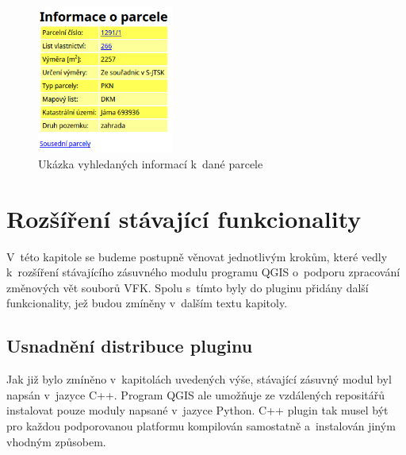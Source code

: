 \documentclass[a4paper,12pt,oneside]{book}
\begin{document}
\begin{figure}[htb]
\centering
\includegraphics[width=0.4\textwidth]{images/vfkPlugin-informace_o_parcele.png}
\caption[Ukázka vyhledaných informací k~dané parcele]{Ukázka vyhledaných informací k~dané parcele}
\label{l_informace_o_parcele}
\end{figure}



\clearpage
\chapter{Rozšíření stávající funkcionality}
\label{l_rozsireni_funkcionality}

V~této kapitole se budeme postupně věnovat jednotlivým krokům,
které vedly k~rozšíření stávajícího zásuvného modulu programu QGIS
o~podporu zpracování změnových vět souborů VFK. Spolu s~tímto byly do
pluginu přidány další funkcionality, jež budou zmíněny v~dalším textu kapitoly.

\section{Usnadnění distribuce pluginu}

Jak již bylo zmíněno v~kapitolách uvedených výše, stávající zásuvný modul 
byl napsán v~jazyce C++. Program QGIS ale umožňuje ze vzdálených repositářů
instalovat pouze moduly napsané v~jazyce Python. C++ plugin tak musel být
pro každou podporovanou platformu kompilován samostatně a~instalován jiným 
vhodným způsobem.
\end{document}
